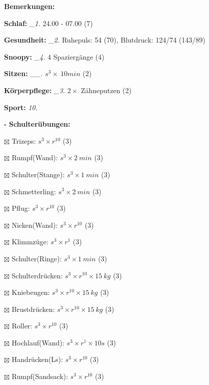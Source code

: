 \documentclass[10pt,a4paper]{article}
\newcommand\prop[1] {{\color {alizarin} {\bf #1}}}             %
\newcommand\mand[1] {{\color {burntorange} {\bf #1}}}          %
\newcommand\topspace{\vskip -15pt \hskip 20pt}
\newcommand\n[1] { {\sl #1.} \hskip 5pt }
\begin{document}
\begin{mdframed}[style=daystyle]
  \begin{labeling}{{\mand {Bemerkungen:}}}
    \setlength\itemsep{-3pt}
  \item[{\mand {Schlaf:}}]        \n{\_1} 24.00 - 07.00 (7)
  \item[{\mand {Gesundheit:}}]    \n{\_2} Ruhepuls: 54 (70), Blutdruck: 124/74 (143/89)
  \item[{\mand {Snoopy:}}]        \n{\_4} 4 Spaziergänge (4) 
  \item[{\mand {Sitzen:}}]       \n{\_\_} $s^3 \times\ 10 min$ (2)
  \item[{\mand {Körperpflege:}}]  \n{\_3} $2 \times$ Zähneputzen (2)
  \item[{\mand {Sport:}}]          \n{10}
    \topspace
    \begin{minipage}{0.75\textwidth}  
      \begin{labeling}{\prop {$\square$ {Schulterübungen:}}} 
        \setlength\itemsep{-3pt}
      \item[$\boxtimes$ Trizeps:]          $s^3 \times r^{10}$ (3)
      \item[$\boxtimes$ Rumpf(Wand):]      $s^3 \times 2\ min$ (3)
      \item[$\boxtimes$ Schulter(Stange):] $s^3 \times 1\ min$ (3)
      \item[$\boxtimes$ Schmetterling:]    $s^3 \times 2\ min$ (3)
      \item[$\boxtimes$ Pflug:]            $s^3 \times r^{10}$ (3)
      \item[$\boxtimes$ Nicken(Wand):]     $s^3 \times r^{10}$ (3)
      \item[$\boxtimes$ Klimmzüge:]        $s^3 \times r^1$ (3)
      \item[$\boxtimes$ Schulter(Ringe):]  $s^3 \times 1\ min$ (3)
      \item[$\boxtimes$ Schulterdrücken:]  $s^3 \times r^{10} \times 15\ kg$ (3)
      \item[$\boxtimes$ Kniebeugen:]       $s^3 \times r^{10} \times 15\ kg$ (3)
      \item[$\boxtimes$ Brustdrücken:]     $s^3 \times r^{10} \times 15\ kg$ (3)
      \item[$\boxtimes$ Roller:]           $s^3 \times r^{10}$ (3)
      \item[$\boxtimes$ Hochlauf(Wand):]   $s^3 \times r^{1} \times 10s$ (3)
      \item[$\boxtimes$ Handrücken(Ls):]   $s^3 \times r^{10}$ (3)
      \item[$\boxtimes$ Rumpf(Sandsack):]  $s^3 \times r^{10}$ (3)

\end{labeling}
\end{minipage}
\end{labeling}
\end{mdframed}
\end{document}
